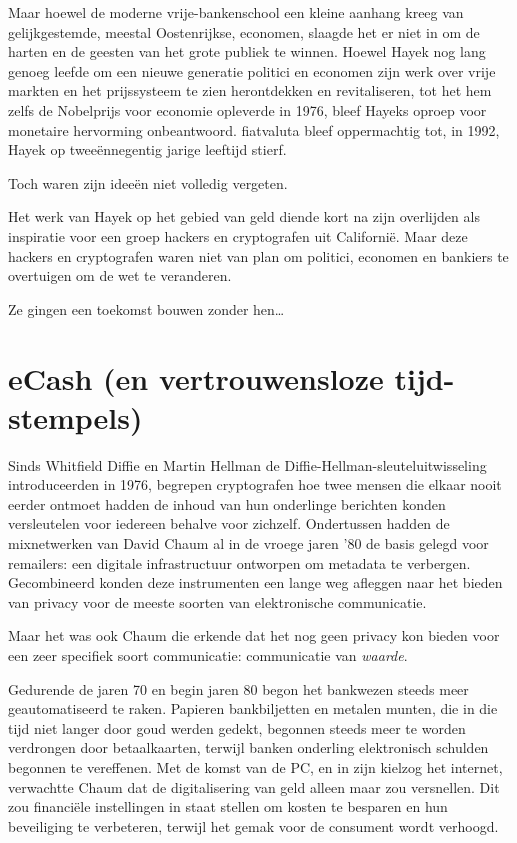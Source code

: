 \documentclass[
  a5paper,
  smalldemyvopaper,11pt,twoside,onecolumn,openright,extrafontsizes,
hidelinks]{memoir}
\begin{document}
Maar hoewel de moderne vrije-bankenschool een kleine aanhang kreeg van
gelijkgestemde, meestal Oostenrijkse, economen, slaagde het er niet in
om de harten en de geesten van het grote publiek te winnen. Hoewel Hayek
nog lang genoeg leefde om een nieuwe generatie politici en economen zijn
werk over vrije markten en het prijssysteem te zien herontdekken en
revitaliseren, tot het hem zelfs de Nobelprijs voor economie opleverde
in 1976, bleef Hayeks oproep voor monetaire hervorming onbeantwoord.
fiatvaluta bleef oppermachtig tot, in 1992, Hayek op tweeënnegentig
jarige leeftijd stierf.

Toch waren zijn ideeën niet volledig vergeten.

Het werk van Hayek op het gebied van geld diende kort na zijn overlijden
als inspiratie voor een groep hackers en cryptografen uit Californië.
Maar deze hackers en cryptografen waren niet van plan om politici,
economen en bankiers te overtuigen om de wet te veranderen.

Ze gingen een toekomst bouwen zonder hen\ldots{}

\chapter{eCash (en vertrouwensloze
tijd-stempels)}\label{ecash-en-vertrouwensloze-tijd-stempels}

Sinds Whitfield Diffie en Martin Hellman de
Diffie-Hellman-sleuteluitwisseling introduceerden in 1976, begrepen
cryptografen hoe twee mensen die elkaar nooit eerder ontmoet hadden de
inhoud van hun onderlinge berichten konden versleutelen voor iedereen
behalve voor zichzelf. Ondertussen hadden de mixnetwerken van David
Chaum al in de vroege jaren '80 de basis gelegd voor remailers: een
digitale infrastructuur ontworpen om metadata te verbergen. Gecombineerd
konden deze instrumenten een lange weg afleggen naar het bieden van
privacy voor de meeste soorten van elektronische communicatie.

Maar het was ook Chaum die erkende dat het nog geen privacy kon bieden
voor een zeer specifiek soort communicatie: communicatie van
\emph{waarde}.

Gedurende de jaren 70 en begin jaren 80 begon het bankwezen steeds meer
geautomatiseerd te raken. Papieren bankbiljetten en metalen munten, die
in die tijd niet langer door goud werden gedekt, begonnen steeds meer te
worden verdrongen door betaalkaarten, terwijl banken onderling
elektronisch schulden begonnen te vereffenen. Met de komst van de PC, en
in zijn kielzog het internet, verwachtte Chaum dat de digitalisering van
geld alleen maar zou versnellen. Dit zou financiële instellingen in
staat stellen om kosten te besparen en hun beveiliging te verbeteren,
terwijl het gemak voor de consument wordt verhoogd.
\end{document}
